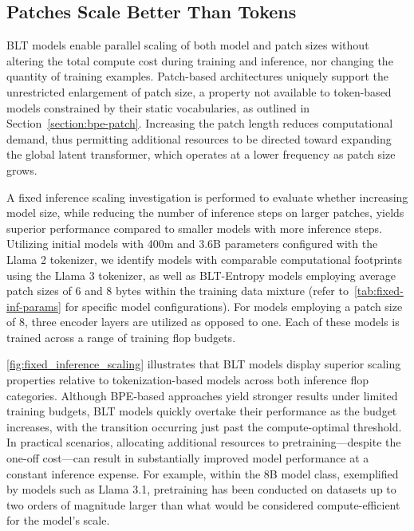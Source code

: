\subsection{Patches Scale Better Than Tokens} {\textsc BLT} models enable parallel scaling of both model and patch sizes without altering the total compute cost during training and inference, nor changing the quantity of training examples. Patch-based architectures uniquely support the unrestricted enlargement of patch size, a property not available to token-based models constrained by their static vocabularies, as outlined in Section~\ref{section:bpe-patch}. Increasing the patch length reduces computational demand, thus permitting additional resources to be directed toward expanding the global latent transformer, which operates at a lower frequency as patch size grows.

A fixed inference scaling investigation is performed to evaluate whether increasing model size, while reducing the number of inference steps on larger patches, yields superior performance compared to smaller models with more inference steps. Utilizing initial models with 400m and 3.6B parameters configured with the Llama 2 tokenizer, we identify models with comparable computational footprints using the Llama 3 tokenizer, as well as {\textsc BLT}-Entropy models employing average patch sizes of 6 and 8 bytes within the training data mixture (refer to~\autoref{tab:fixed-inf-params} for specific model configurations). For models employing a patch size of 8, three encoder layers are utilized as opposed to one. Each of these models is trained across a range of training flop budgets.

\autoref{fig:fixed_inference_scaling} illustrates that {\textsc BLT} models display superior scaling properties relative to tokenization-based models across both inference flop categories. Although BPE-based approaches yield stronger results under limited training budgets, {\textsc BLT} models quickly overtake their performance as the budget increases, with the transition occurring just past the compute-optimal threshold. In practical scenarios, allocating additional resources to pretraining—despite the one-off cost—can result in substantially improved model performance at a constant inference expense. For example, within the 8B model class, exemplified by models such as Llama 3.1, pretraining has been conducted on datasets up to two orders of magnitude larger than what would be considered compute-efficient for the model's scale.

